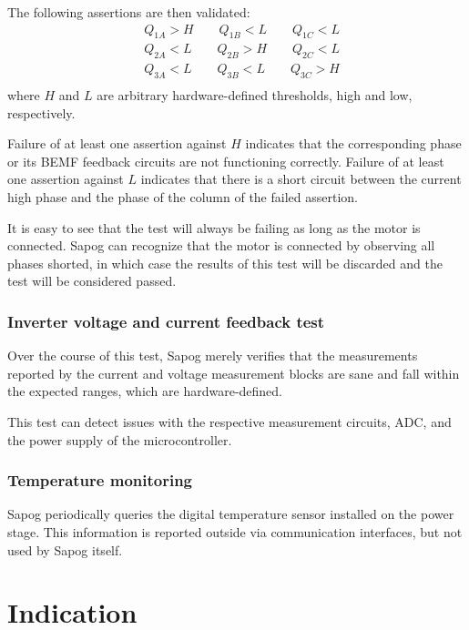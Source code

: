 \documentclass{zubaxdoc}
\begin{document}
The following assertions are then validated:
\begin{equation}
\begin{aligned}
&Q_{1A} > H \qquad{} Q_{1B} < L \qquad{} Q_{1C} < L \\
&Q_{2A} < L \qquad{} Q_{2B} > H \qquad{} Q_{2C} < L \\
&Q_{3A} < L \qquad{} Q_{3B} < L \qquad{} Q_{3C} > H \\
\end{aligned}
\end{equation}
where $H$ and $L$ are arbitrary hardware-defined thresholds, high and low, respectively.

Failure of at least one assertion against $H$ indicates that the corresponding phase
or its BEMF feedback circuits are not functioning correctly.
Failure of at least one assertion against $L$ indicates that there is a short circuit between
the current high phase and the phase of the column of the failed assertion.

It is easy to see that the test will always be failing as long as the motor is connected.
Sapog can recognize that the motor is connected by observing all phases shorted,
in which case the results of this test will be discarded and the test will be considered passed.

\subsection{Inverter voltage and current feedback test}

Over the course of this test, Sapog merely verifies that the measurements reported by the
current and voltage measurement blocks are sane and fall within the expected ranges,
which are hardware-defined.

This test can detect issues with the respective measurement circuits,
ADC, and the power supply of the microcontroller.

\subsection{Temperature monitoring}

Sapog periodically queries the digital temperature sensor installed on the power stage.
This information is reported outside via communication interfaces, but not used
by Sapog itself.

\chapter{Indication}\label{sec:indication}
\end{document}

